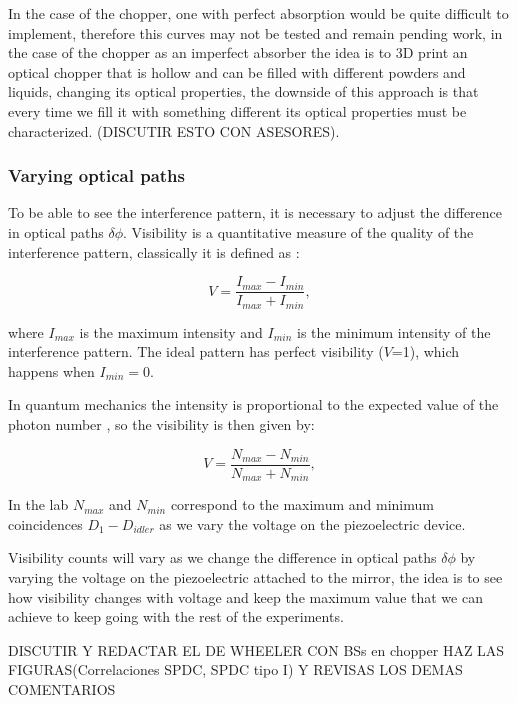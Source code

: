 \documentclass[12pt]{book}
\begin{document}
In the case of the chopper, one with perfect absorption would be quite difficult to implement, therefore this curves may not be tested and remain pending work, in the case of the chopper as an imperfect absorber the idea is to 3D print an optical chopper that is hollow and can be filled with different powders and liquids, changing its optical properties, the downside of this approach is that every time we fill it with something different its optical properties must be characterized. (DISCUTIR ESTO CON ASESORES).



\subsubsection{Varying optical paths}

To be able to see the interference pattern, it is necessary to adjust the difference in optical paths $\delta \phi$. Visibility is a quantitative measure of the quality of the interference pattern, classically it is defined as \cite{hecht}:

\begin{equation}
V=\frac{I_{max}-I_{min}}{I_{max}+I_{min}},
\end{equation}

where $I_{max}$ is the maximum intensity and $I_{min}$ is the minimum intensity of the interference pattern. The ideal pattern has perfect visibility ($V$=1), which happens when $I_{min}=0$.

In quantum mechanics the intensity is proportional to the expected value of the photon number \cite {glauber}, so the visibility is then given by:

\begin{equation}
V=\frac{N_{max}-N_{min}}{N_{max}+N_{min}},
\end{equation}

In the lab $N_{max}$ and $N_{min}$ correspond to the maximum and minimum coincidences $D_{1}-D_{idler}$ as we vary the voltage on the piezoelectric device.

Visibility counts will vary as we change the difference in optical paths $\delta\phi$ by varying the voltage on the piezoelectric attached to the mirror, the idea is to see how visibility changes with voltage and keep the maximum value that we can achieve to keep going with the rest of the experiments.


DISCUTIR Y REDACTAR EL DE WHEELER CON BSs en chopper
 HAZ LAS FIGURAS(Correlaciones SPDC, SPDC tipo I) Y REVISAS LOS DEMAS COMENTARIOS
 
\end{document}
